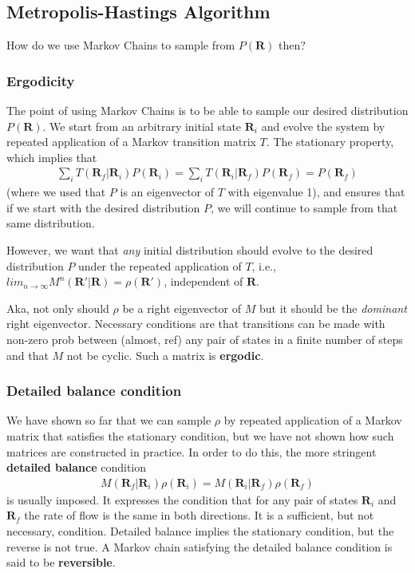 \documentclass[twoside,english]{uiofysmaster}
\begin{document}
\subsection{Metropolis-Hastings Algorithm}
\label{sec:MetroHastings}

How do we use Markov Chains to sample from $P(\bm{R})$ then?

\subsubsection{Ergodicity}
The point of using Markov Chains is to be able to sample our desired distribution $P(\bm{R})$. We start from an arbitrary initial state $\bm{R}_i$ and evolve the system by repeated application of a Markov transition matrix $T$. The stationary property, which implies that
\begin{align}
	\sum_i T(\bm{R}_f | \bm{R}_i) P (\bm{R}_i) = \sum_i T (\bm{R}_i | \bm{R}_f) P (\bm{R}_f) = P(\bm{R}_f)
\end{align}
(where we used that $P$ is an eigenvector of $T$ with eigenvalue 1), and ensures that if we start with the desired distribution $P$, we will continue to sample from that same distribution.

However, we want that \textit{any} initial distribution should evolve to the desired distribution $P$ under the repeated application of $T$, i.e., $lim_{n\rightarrow \infty} M^n (\bm{R}' | \bm{R}) = \rho(\bm{R}')$, independent of $\bm{R}$. 

Aka, not only should $\rho$ be a right eigenvector of $M$ but it should be the \textit{dominant} right eigenvector. Necessary conditions are that transitions can be made with non-zero prob between (almost, ref) any pair of states in a finite number of steps and that $M$ not be cyclic. Such a matrix is \textbf{ergodic}. 
\cite{Umrigar1999}

\subsubsection{Detailed balance condition}
We have shown so far that we can sample $\rho$ by repeated application of a Markov matrix that satisfies the stationary condition, but we have not shown how such matrices are constructed in practice. In order to do this, the more stringent \textbf{detailed balance} condition
\begin{align}
	M(\bm{R}_f | \bm{R}_i ) \rho(\bm{R}_i) = M(\bm{R}_i | \bm{R}_f ) \rho(\bm{R}_f)
\end{align}
is usually imposed. 
It expresses the condition that for any pair of states $\bm{R}_i$ and $\bm{R}_f$ the rate of flow is the same in both directions. It is a sufficient, but not necessary, condition. Detailed balance implies the stationary condition, but the reverse is not true.
\cite{Umrigar1999}
A Markov chain satisfying the detailed balance condition is said to be \textbf{reversible}.\cite{Toulouse2016} 
\end{document}
